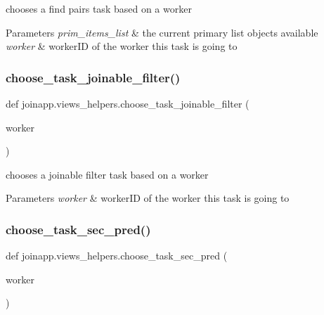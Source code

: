 chooses a find pairs task based on a worker 


\begin{DoxyParams}{Parameters}
{\em prim\+\_\+items\+\_\+list} & the current primary list objects available \\
\hline
{\em worker} & worker\+ID of the worker this task is going to \\
\hline
\end{DoxyParams}
\mbox{\label{namespacejoinapp_1_1views__helpers_a6520bad88409993e2fd43bc18136589a}} 
\subsubsection{\texorpdfstring{choose\_task\_joinable\_filter()}{choose\_task\_joinable\_filter()}}
{\footnotesize\ttfamily def joinapp.\+views\+\_\+helpers.\+choose\+\_\+task\+\_\+joinable\+\_\+filter (\begin{DoxyParamCaption}\item[{}]{worker }\end{DoxyParamCaption})}



chooses a joinable filter task based on a worker 


\begin{DoxyParams}{Parameters}
{\em worker} & worker\+ID of the worker this task is going to \\
\hline
\end{DoxyParams}
\mbox{\label{namespacejoinapp_1_1views__helpers_a1dbf2ade9c80cee800fe671327226ba4}} 
\subsubsection{\texorpdfstring{choose\_task\_sec\_pred()}{choose\_task\_sec\_pred()}}
{\footnotesize\ttfamily def joinapp.\+views\+\_\+helpers.\+choose\+\_\+task\+\_\+sec\+\_\+pred (\begin{DoxyParamCaption}\item[{}]{worker }\end{DoxyParamCaption})}



